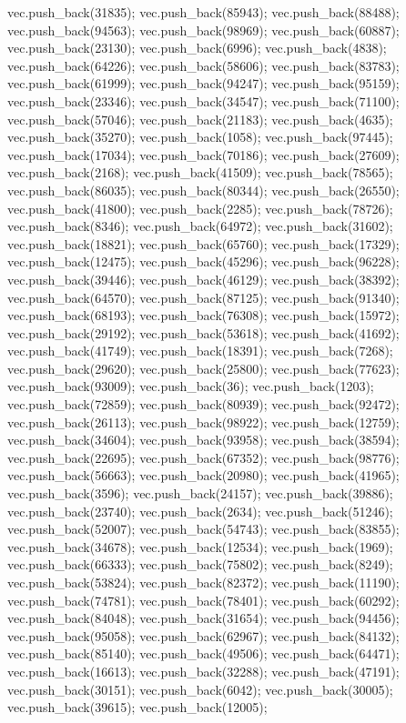 vec.push_back(31835);
vec.push_back(85943);
vec.push_back(88488);
vec.push_back(94563);
vec.push_back(98969);
vec.push_back(60887);
vec.push_back(23130);
vec.push_back(6996);
vec.push_back(4838);
vec.push_back(64226);
vec.push_back(58606);
vec.push_back(83783);
vec.push_back(61999);
vec.push_back(94247);
vec.push_back(95159);
vec.push_back(23346);
vec.push_back(34547);
vec.push_back(71100);
vec.push_back(57046);
vec.push_back(21183);
vec.push_back(4635);
vec.push_back(35270);
vec.push_back(1058);
vec.push_back(97445);
vec.push_back(17034);
vec.push_back(70186);
vec.push_back(27609);
vec.push_back(2168);
vec.push_back(41509);
vec.push_back(78565);
vec.push_back(86035);
vec.push_back(80344);
vec.push_back(26550);
vec.push_back(41800);
vec.push_back(2285);
vec.push_back(78726);
vec.push_back(8346);
vec.push_back(64972);
vec.push_back(31602);
vec.push_back(18821);
vec.push_back(65760);
vec.push_back(17329);
vec.push_back(12475);
vec.push_back(45296);
vec.push_back(96228);
vec.push_back(39446);
vec.push_back(46129);
vec.push_back(38392);
vec.push_back(64570);
vec.push_back(87125);
vec.push_back(91340);
vec.push_back(68193);
vec.push_back(76308);
vec.push_back(15972);
vec.push_back(29192);
vec.push_back(53618);
vec.push_back(41692);
vec.push_back(41749);
vec.push_back(18391);
vec.push_back(7268);
vec.push_back(29620);
vec.push_back(25800);
vec.push_back(77623);
vec.push_back(93009);
vec.push_back(36);
vec.push_back(1203);
vec.push_back(72859);
vec.push_back(80939);
vec.push_back(92472);
vec.push_back(26113);
vec.push_back(98922);
vec.push_back(12759);
vec.push_back(34604);
vec.push_back(93958);
vec.push_back(38594);
vec.push_back(22695);
vec.push_back(67352);
vec.push_back(98776);
vec.push_back(56663);
vec.push_back(20980);
vec.push_back(41965);
vec.push_back(3596);
vec.push_back(24157);
vec.push_back(39886);
vec.push_back(23740);
vec.push_back(2634);
vec.push_back(51246);
vec.push_back(52007);
vec.push_back(54743);
vec.push_back(83855);
vec.push_back(34678);
vec.push_back(12534);
vec.push_back(1969);
vec.push_back(66333);
vec.push_back(75802);
vec.push_back(8249);
vec.push_back(53824);
vec.push_back(82372);
vec.push_back(11190);
vec.push_back(74781);
vec.push_back(78401);
vec.push_back(60292);
vec.push_back(84048);
vec.push_back(31654);
vec.push_back(94456);
vec.push_back(95058);
vec.push_back(62967);
vec.push_back(84132);
vec.push_back(85140);
vec.push_back(49506);
vec.push_back(64471);
vec.push_back(16613);
vec.push_back(32288);
vec.push_back(47191);
vec.push_back(30151);
vec.push_back(6042);
vec.push_back(30005);
vec.push_back(39615);
vec.push_back(12005);
